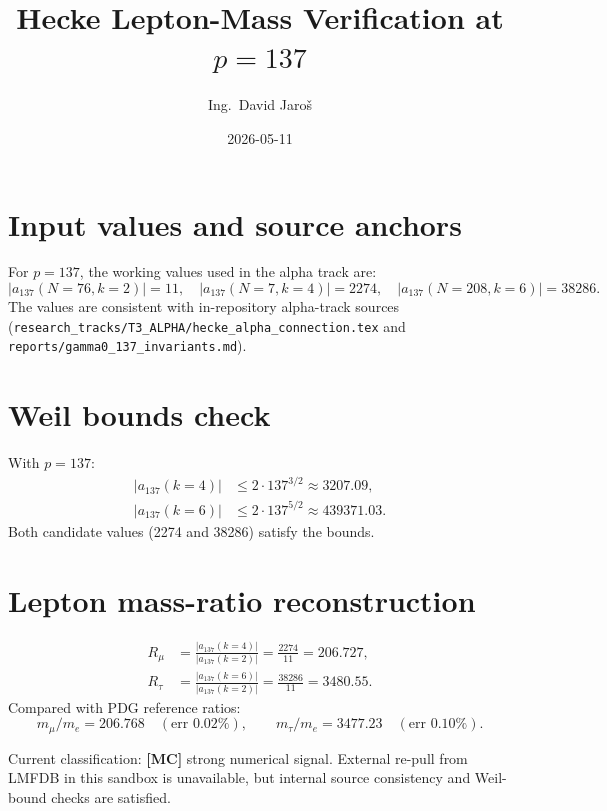 \documentclass[12pt,a4paper]{article}
\title{\textbf{Hecke Lepton-Mass Verification at $p=137$}}
\author{Ing.\ David Jaro\v{s}}
\date{2026-05-11}
\begin{document}
  \maketitle
\fi

\section{Input values and source anchors}

For $p=137$, the working values used in the alpha track are:
\[
|a_{137}(N=76,k=2)|=11,\quad
|a_{137}(N=7,k=4)|=2274,\quad
|a_{137}(N=208,k=6)|=38286.
\]
The values are consistent with in-repository alpha-track sources
(\texttt{research\_tracks/T3\_ALPHA/hecke\_alpha\_connection.tex} and
\texttt{reports/gamma0\_137\_invariants.md}).

\section{Weil bounds check}

With $p=137$:
\begin{align}
|a_{137}(k=4)| &\le 2\cdot 137^{3/2} \approx 3207.09,\\
|a_{137}(k=6)| &\le 2\cdot 137^{5/2} \approx 439371.03.
\end{align}
Both candidate values (2274 and 38286) satisfy the bounds.

\section{Lepton mass-ratio reconstruction}

\begin{align}
R_\mu &= \frac{|a_{137}(k=4)|}{|a_{137}(k=2)|}
= \frac{2274}{11} = 206.727,\\
R_\tau &= \frac{|a_{137}(k=6)|}{|a_{137}(k=2)|}
= \frac{38286}{11} = 3480.55.
\end{align}
Compared with PDG reference ratios:
\[
m_\mu/m_e = 206.768 \quad(\text{err }0.02\%),\qquad
m_\tau/m_e = 3477.23 \quad(\text{err }0.10\%).
\]

\begin{resultbox}
Current classification: \textbf{[MC]} strong numerical signal.
External re-pull from LMFDB in this sandbox is unavailable, but internal
source consistency and Weil-bound checks are satisfied.
\end{resultbox}

\ifdefined\INCLUDEMODE
\else
  
\end{document}
